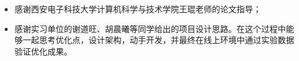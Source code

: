 \begin{itemize}
    \item 感谢西安电子科技大学计算机科学与技术学院王琨老师的论文指导；
    \item 感谢实习单位的谢道旺、胡晨曦等同学给出的项目设计思路。在这个过程中能够一起思考优化点，设计架构，动手开发，并最终在线上环境中通过实验数据验证优化成果。
\end{itemize}
